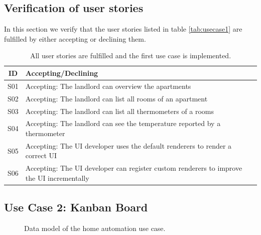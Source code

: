 \subsection{Verification of user stories}
In this section we verify that the user stories listed in table \ref{tab:usecase1} are fulfilled by either accepting or declining them.

\begin{table}
  \begin{center}
    \begin{tabular}{ |c|l| }
      \hline
      ID & Accepting/Declining \\
      \hline
      S01 & Accepting: The landlord can overview the apartments \\
      S02 & Accepting: The landlord can list all rooms of an apartment \\
      S03 & Accepting: The landlord can list all thermometers of a rooms \\
      S04 & Accepting: The landlord can see the temperature reported by a thermometer \\
      S05 & Accepting: The UI developer uses the default renderers to render a correct UI \\
      S06 & Accepting: The UI developer can register custom renderers to improve the UI incrementally \\
      \hline
    \end{tabular}
    \caption{All user stories are fulfilled and the first use case is implemented.}
  \end{center}
\end{table}

\subsection{Use Case 2: Kanban Board}

\begin{figure}[!htb]
  \caption{Data model of the home automation use case.}
\end{figure}

